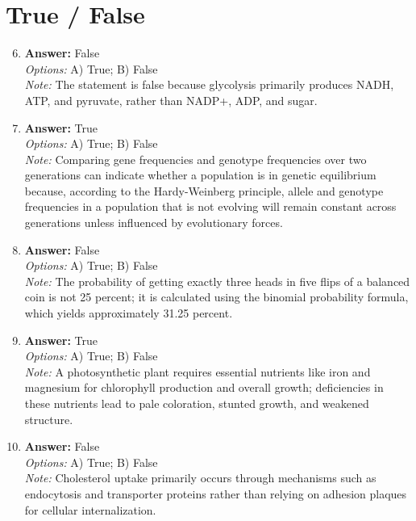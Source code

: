 \documentclass[12pt]{article}
\begin{document}
\section*{True / False}
\begin{enumerate}[label=\arabic*.]
\setcounter{enumi}{5}
\item \textbf{Answer:} False
\\ \textit{Options:} A) True; B) False
\\ \textit{Note:} The statement is false because glycolysis primarily produces NADH, ATP, and pyruvate, rather than NADP+, ADP, and sugar.
\item \textbf{Answer:} True
\\ \textit{Options:} A) True; B) False
\\ \textit{Note:} Comparing gene frequencies and genotype frequencies over two generations can indicate whether a population is in genetic equilibrium because, according to the Hardy-Weinberg principle, allele and genotype frequencies in a population that is not evolving will remain constant across generations unless influenced by evolutionary forces.
\item \textbf{Answer:} False
\\ \textit{Options:} A) True; B) False
\\ \textit{Note:} The probability of getting exactly three heads in five flips of a balanced coin is not 25 percent; it is calculated using the binomial probability formula, which yields approximately 31.25 percent.
\item \textbf{Answer:} True
\\ \textit{Options:} A) True; B) False
\\ \textit{Note:} A photosynthetic plant requires essential nutrients like iron and magnesium for chlorophyll production and overall growth; deficiencies in these nutrients lead to pale coloration, stunted growth, and weakened structure.
\item \textbf{Answer:} False
\\ \textit{Options:} A) True; B) False
\\ \textit{Note:} Cholesterol uptake primarily occurs through mechanisms such as endocytosis and transporter proteins rather than relying on adhesion plaques for cellular internalization.
\end{enumerate}
\end{document}
